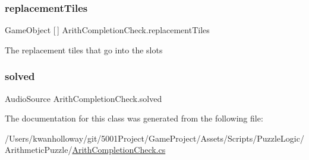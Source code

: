 \mbox{\label{class_arith_completion_check_a3e4dcde9c1f9660ba26ed864b0a465ac}} 
\subsubsection{\texorpdfstring{replacement\+Tiles}{replacementTiles}}
{\footnotesize\ttfamily Game\+Object \mbox{[}$\,$\mbox{]} Arith\+Completion\+Check.\+replacement\+Tiles}



The replacement tiles that go into the slots 

\mbox{\label{class_arith_completion_check_a3621baade2321e11481457c53e853595}} 
\subsubsection{\texorpdfstring{solved}{solved}}
{\footnotesize\ttfamily Audio\+Source Arith\+Completion\+Check.\+solved}



The documentation for this class was generated from the following file\+:\begin{DoxyCompactItemize}
\item 
/\+Users/kwanholloway/git/5001\+Project/\+Game\+Project/\+Assets/\+Scripts/\+Puzzle\+Logic/\+Arithmetic\+Puzzle/\hyperlink{_arith_completion_check_8cs}{Arith\+Completion\+Check.\+cs}\end{DoxyCompactItemize}
